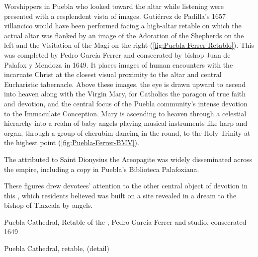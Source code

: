Worshippers in Puebla who looked toward the altar while listening were presented
with a resplendent vista of images.
Gutiérrez de Padilla's 1657 villancico would have been performed facing a
high-altar retable on which the actual altar was flanked by an image of the
Adoration of the Shepherds on the left and the Visitation of the Magi on the
right (\cref{fig:Puebla-Ferrer-Retablo}).
This  was completed by Pedro García Ferrer and
consecrated by bishop Juan de Palafox y Mendoza in 1649.
It places images of human encounters with the incarnate Christ at the closest
visual proximity to the altar and central Eucharistic tabernacle.%
    \Autocite{Gali:GarciaFerrer}
Above these images, the eye is drawn upward to ascend into heaven along with the
Virgin Mary, for Catholics the paragon of true faith and devotion, and the
central focus of the Puebla community's intense devotion to the Immaculate
Conception.
Mary is ascending to heaven through a celestial hierarchy  into a realm of baby
angels playing musical instruments like harp and organ, through a group of
cherubim dancing in the round, to the Holy Trinity at the highest point
(\cref{fig:Puebla-Ferrer-BMV}).%
\begin{Footnote}
    The  attributed to Saint Dionysius the
    Areopagite was widely disseminated across the empire, including a
    copy in Puebla's Biblioteca Palafoxiana.
\end{Footnote}
These figures drew devotees' attention to the other central object of devotion
in this , which residents believed was built on a
site revealed in a dream to the bishop of Tlaxcala by angels.%
    \Autocites
    [67--68]{Lomeli:Puebla}
    [21]{AngelContreras:Puebla}

{Puebla Cathedral, Retable of the , Pedro García
Ferrer and studio, consecrated 1649}
  
{Puebla Cathedral, retable,  (detail)} 

